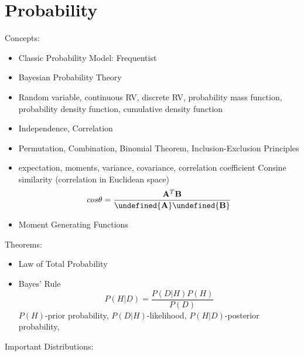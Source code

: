 \documentclass[11pt, openany]{book}              %
\let\norm\undefined %
\DeclarePairedDelimiter\norm{\lVert}{\rVert}
\begin{document}
\section{Probability}

Concepts:

\begin{itemize}
    \item Classic Probability Model: Frequentist 
    \item Bayesian Probability Theory 
    \item Random variable, continuous RV, discrete RV, probability mass function, probability density function, cumulative density function
    \item Independence, Correlation
    \item Permutation, Combination, Binomial Theorem, Inclusion-Exclusion Principles
    \item expectation, moments, variance, covariance, correlation coefficient
    	\subitem Consine similarity (correlation in Euclidean space)
    	  $$cos\theta = \frac{\mathbf{A}^T\mathbf{B}}{\norm{\mathbf{A}}\norm{\mathbf{B}}}	$$
    \item Moment Generating Functions 
\end{itemize}


Theorems:

\begin{itemize}
    \item Law of Total Probability
    \item Bayes' Rule $$P(H|D) = \frac{P(D|H) P(H)}{P(D)}$$ $P(H)$-prior probability, $P(D|H)$-likelihood, $P(H|D)$-posterior probability,
\end{itemize}

Important Distributions: 
\end{document}

